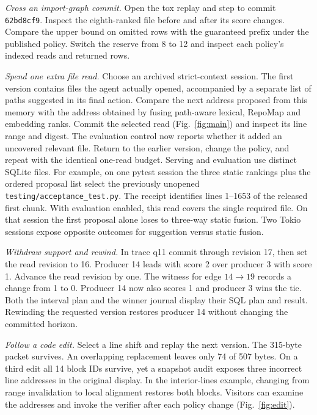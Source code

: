 \documentclass[conference]{IEEEtran}
\begin{document}
\textit{Cross an import-graph commit.} Open the tox replay and step to commit \texttt{62bd8cf9}. Inspect the eighth-ranked file before and after its score changes. Compare the upper bound on omitted rows with the guaranteed prefix under the published policy. Switch the reserve from 8 to 12 and inspect each policy's indexed reads and returned rows.

\textit{Spend one extra file read.} Choose an archived strict-context session. The first version contains files the agent actually opened, accompanied by a separate list of paths suggested in its final action. Compare the next address proposed from this memory with the address obtained by fusing path-aware lexical, RepoMap and embedding ranks. Commit the selected read (Fig.~\ref{fig:main}) and inspect its line range and digest. The evaluation control now reports whether it added an uncovered relevant file. Return to the earlier version, change the policy, and repeat with the identical one-read budget. Serving and evaluation use distinct SQLite files. For example, on one pytest session the three static rankings plus the ordered proposal list select the previously unopened \texttt{testing/acceptance\_test.py}. The receipt identifies lines 1--1653 of the released first chunk. With evaluation enabled, this read covers the single required file. On that session the first proposal alone loses to three-way static fusion. Two Tokio sessions expose opposite outcomes for suggestion versus static fusion.

\textit{Withdraw support and rewind.} In trace q11 commit through revision 17, then set the read revision to 16. Producer 14 leads with score 2 over producer 3 with score 1. Advance the read revision by one. The witness for edge $14\to19$ records a change from 1 to 0. Producer 14 now also scores 1 and producer 3 wins the tie. Both the interval plan and the winner journal display their SQL plan and result. Rewinding the requested version restores producer 14 without changing the committed horizon.

\textit{Follow a code edit.} Select a line shift and replay the next version. The 315-byte packet survives. An overlapping replacement leaves only 74 of 507 bytes. On a third edit all 14 block IDs survive, yet a snapshot audit exposes three incorrect line addresses in the original display. In the interior-lines example, changing from range invalidation to local alignment restores both blocks. Visitors can examine the addresses and invoke the verifier after each policy change (Fig.~\ref{fig:edit}).
\end{document}
